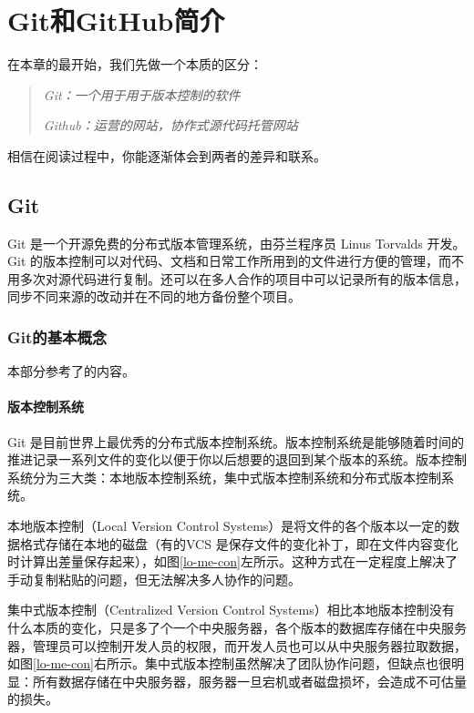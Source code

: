 \chapter{Git和GitHub简介}
在本章的最开始，我们先做一个本质的区分：
\begin{quotation}
    \textit{Git：一个用于用于版本控制的软件}

    \textit{Github：运营的网站，协作式源代码托管网站}
\end{quotation}

相信在阅读过程中，你能逐渐体会到两者的差异和联系。

\section{Git}
Git 是一个开源免费的分布式版本管理系统，由芬兰程序员 Linus Torvalds 开发。Git 的版本控制可以对代码、文档和日常工作所用到的文件进行方便的管理，而不用多次对源代码进行复制。还可以在多人合作的项目中可以记录所有的版本信息，同步不同来源的改动并在不同的地方备份整个项目。

\subsection{Git的基本概念}
本部分参考了\cite{git-cong}的内容。
\subsubsection{版本控制系统}
Git 是目前世界上最优秀的分布式版本控制系统。版本控制系统是能够随着时间的推进记录一系列文件的变化以便于你以后想要的退回到某个版本的系统。版本控制系统分为三大类：本地版本控制系统，集中式版本控制系统和分布式版本控制系统。

本地版本控制（Local Version Control Systems）是将文件的各个版本以一定的数据格式存储在本地的磁盘（有的VCS 是保存文件的变化补丁，即在文件内容变化时计算出差量保存起来），如图\ref{lo-me-con}左所示。这种方式在一定程度上解决了手动复制粘贴的问题，但无法解决多人协作的问题。

集中式版本控制（Centralized Version Control Systems）相比本地版本控制没有什么本质的变化，只是多了个一个中央服务器，各个版本的数据库存储在中央服务器，管理员可以控制开发人员的权限，而开发人员也可以从中央服务器拉取数据，如图\ref{lo-me-con}右所示。集中式版本控制虽然解决了团队协作问题，但缺点也很明显：所有数据存储在中央服务器，服务器一旦宕机或者磁盘损坏，会造成不可估量的损失。

